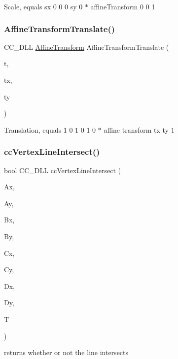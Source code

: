 Scale, equals sx 0 0 0 sy 0 $\ast$ affine\+Transform 0 0 1 \mbox{\label{group__base_gaefdb84585eca14848606e09f00088cc9}} 
\subsubsection{\texorpdfstring{Affine\+Transform\+Translate()}{AffineTransformTranslate()}}
{\footnotesize\ttfamily C\+C\+\_\+\+D\+LL \hyperlink{structAffineTransform}{Affine\+Transform} Affine\+Transform\+Translate (\begin{DoxyParamCaption}\item[{const \hyperlink{structAffineTransform}{Affine\+Transform} \&}]{t,  }\item[{float}]{tx,  }\item[{float}]{ty }\end{DoxyParamCaption})}

Translation, equals 1 0 1 0 1 0 $\ast$ affine transform tx ty 1 \mbox{\label{group__base_gaa5ca38fd1d4151aca5d860f2c3e30c38}} 
\subsubsection{\texorpdfstring{cc\+Vertex\+Line\+Intersect()}{ccVertexLineIntersect()}}
{\footnotesize\ttfamily bool C\+C\+\_\+\+D\+LL cc\+Vertex\+Line\+Intersect (\begin{DoxyParamCaption}\item[{float}]{Ax,  }\item[{float}]{Ay,  }\item[{float}]{Bx,  }\item[{float}]{By,  }\item[{float}]{Cx,  }\item[{float}]{Cy,  }\item[{float}]{Dx,  }\item[{float}]{Dy,  }\item[{float $\ast$}]{T }\end{DoxyParamCaption})}

returns whether or not the line intersects \mbox{\label{group__base_gaa26749abec79b71e6698d254f8b8b07f}} 

